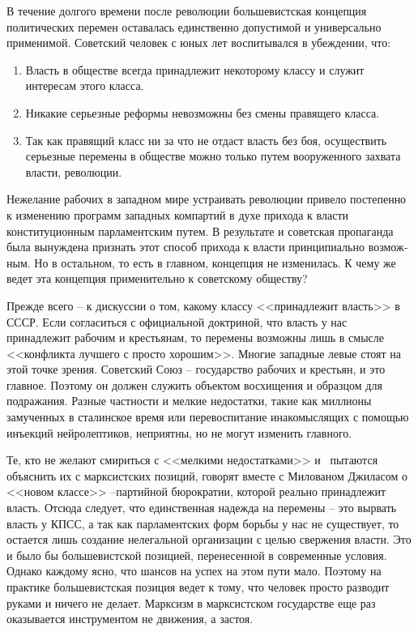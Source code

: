 \documentclass{book}
\begin{document}
В течение долгого времени после революции большевистская концепция политических перемен оставалась единственно допустимой и универсально применимой. Советский человек с юных лет воспитывался в убеждении, что:

\begin{enumerate}
 \item Власть в обществе всегда принадлежит некоторому клас­су и служит интересам этого класса.
 \item Никакие серьезные реформы невозможны без смены правящего класса.
 \item Так как правящий класс ни за что не отдаст власть без боя, осуществить серьезные перемены в обществе можно толь­ко путем вооруженного захвата власти, революции.
\end{enumerate}

Нежелание рабочих в западном мире устраивать революции привело постепенно к изменению программ западных компар­тий в духе прихода к власти конституционным парламентским путем. В результате и советская пропаганда была вынуждена признать этот способ прихода к власти принципиально возмож­ным. Но в остальном, то есть в главном, концепция не измени­лась. К чему же ведет эта концепция применительно к советско­му обществу?

Прежде всего -- к дискуссии о том, какому классу <<принад­лежит власть>> в СССР. Если согласиться с официальной доктри­ной, что власть у нас принадлежит рабочим и крестьянам, то перемены возможны лишь в смысле <<конфликта лучшего с просто хорошим>>. Многие западные левые стоят на этой точке зрения. Советский Союз -- государство рабочих и крестьян, и это главное. Поэтому он должен служить объектом восхищения и образцом для подражания. Разные частности и мелкие недо­статки, такие как миллионы замученных в сталинское время или перевоспитание инакомыслящих с помощью инъекций нейролептиков, неприятны, но не могут изменить главного.

Те, кто не желают смириться с <<мелкими недостатками>> и  пытаются объяснить их с марксистских позиций, говорят вместе с Милованом Джиласом о <<новом классе>> --партийной бюрократии, которой реально принадлежит власть. Отсюда следует, что единственная надежда на перемены -- это вырвать власть у КПСС, а так как парламентских форм борьбы у нас не существует, то остается лишь создание нелегальной организации с целью свержения власти. Это и было бы большевистской позицией, перенесенной в современные условия. Однако каждому ясно, что шансов на успех на этом пути мало. Поэтому на практике большевистская позиция ведет к тому, что человек просто разводит руками и ничего не делает. Марксизм в марксистском государстве еще раз оказывается инструментом не движения, а застоя.
\end{document}
